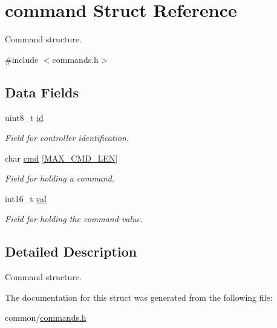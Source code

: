 \hypertarget{structcommand}{\section{command Struct Reference}
\label{structcommand}
}


Command structure.  




{\ttfamily \#include $<$commands.\-h$>$}

\subsection*{Data Fields}
\begin{DoxyCompactItemize}
\item 
\hypertarget{structcommand_a1e6927fa1486224044e568f9c370519b}{uint8\-\_\-t \hyperlink{structcommand_a1e6927fa1486224044e568f9c370519b}{id}}\label{structcommand_a1e6927fa1486224044e568f9c370519b}

\begin{DoxyCompactList}\small\item\em Field for controller identification. \end{DoxyCompactList}\item 
\hypertarget{structcommand_a3e55ff27d8b3a69bd168c46d7771a8bc}{char \hyperlink{structcommand_a3e55ff27d8b3a69bd168c46d7771a8bc}{cmd} \mbox{[}\hyperlink{commands_8h_a1eb73c104b484cf18752169509cebfe2}{M\-A\-X\-\_\-\-C\-M\-D\-\_\-\-L\-E\-N}\mbox{]}}\label{structcommand_a3e55ff27d8b3a69bd168c46d7771a8bc}

\begin{DoxyCompactList}\small\item\em Field for holding a command. \end{DoxyCompactList}\item 
\hypertarget{structcommand_a6b02c18a02d9a0f81a9bcfd71f294b39}{int16\-\_\-t \hyperlink{structcommand_a6b02c18a02d9a0f81a9bcfd71f294b39}{val}}\label{structcommand_a6b02c18a02d9a0f81a9bcfd71f294b39}

\begin{DoxyCompactList}\small\item\em Field for holding the command value. \end{DoxyCompactList}\end{DoxyCompactItemize}


\subsection{Detailed Description}
Command structure. 

The documentation for this struct was generated from the following file\-:\begin{DoxyCompactItemize}
\item 
common/\hyperlink{commands_8h}{commands.\-h}\end{DoxyCompactItemize}
